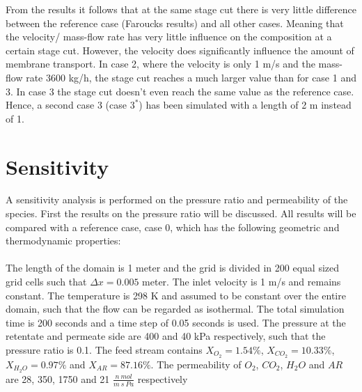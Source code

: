 From the results it follows that at the same stage cut there is very little difference between the reference case (Faroucks results) and all other cases. Meaning that the velocity/ mass-flow rate has very little influence on the composition at a certain stage cut. However, the velocity does significantly influence the amount of membrane transport. In case 2, where the velocity is only 1 m/s and the mass-flow rate 3600 kg/h, the stage cut reaches a much larger value than for case 1 and 3. In case 3 the stage cut doesn't even reach the same value as the reference case. Hence, a second case 3 (case $3^*$) has been simulated with a length of 2 m instead of 1. 
\newpage

\section{Sensitivity}
A sensitivity analysis is performed on the pressure ratio and permeability of the species. First the results on the pressure ratio will be discussed. All results will be compared with a reference case, case 0, which has the following geometric and thermodynamic properties: \\ \\
The length of the domain is 1 meter and the grid is divided in 200 equal sized grid cells such that $\Delta x = 0.005$ meter. The inlet velocity is 1 m/s and remains constant. The temperature is 298 K and assumed to be constant over the entire domain, such that the flow can be regarded as isothermal. The total simulation time is 200 seconds and a time step of 0.05 seconds is used. The pressure at the retentate and permeate side are 400 and 40 kPa respectively, such that the pressure ratio is 0.1. The feed stream contains $X_{O_2}= 1.54 \%$, $X_{CO_2}= 10.33 \%$, $X_{H_2O}= 0.97 \%$ and $X_{AR}= 87.16 \%$. The permeability of $O_2$, $CO_2$, $H_2O$ and $AR$ are 28, 350, 1750 and 21 $\frac{n\ mol}{m \ s \ Pa}$ respectively\\ \\
 

